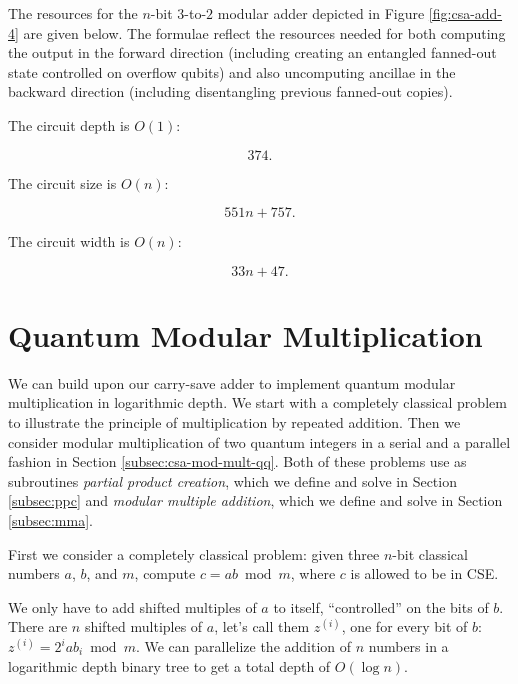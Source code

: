 \documentclass[twoside]{article}
\begin{document}
The resources for the $n$-bit $3$-to-$2$ modular adder depicted in Figure
\ref{fig:csa-add-4} are given below.
The formulae reflect the resources needed for both computing the output
in the forward direction (including creating an entangled fanned-out state
controlled on overflow qubits)
and also uncomputing ancillae in the backward
direction (including disentangling previous fanned-out copies).

The circuit depth is $O(1)$:

\begin{equation}
374\text{.}
\end{equation}

The circuit size is $O(n)$:

\begin{equation}
551n + 757\text{.}
\end{equation}

The circuit width is $O(n)$:

\begin{equation}
33n + 47\text{.}
\end{equation}

%
\section{Quantum Modular Multiplication}
\label{sec:csa-mod-mult}

We can build upon our carry-save adder to implement quantum modular
multiplication in logarithmic depth. We start with a completely classical
problem to illustrate the principle of multiplication by repeated addition.
Then we consider modular multiplication of two quantum integers in a serial
and a parallel fashion in Section
\ref{subsec:csa-mod-mult-qq}. Both of these problems use as subroutines
\emph{partial product creation}, which we define and solve
 in Section \ref{subsec:ppc} and
 \emph{modular multiple addition}, which we define and solve
in Section \ref{subsec:mma}.

First we consider a completely classical problem:
given three $n$-bit classical numbers $a$, $b$, and $m$,
compute $c = ab \bmod m$, where $c$ is allowed to be in CSE.

We only have to add shifted
multiples of $a$ to itself, ``controlled'' on the bits of $b$. There are
$n$ shifted multiples of $a$, let's call them $z^{(i)}$, one for every bit of $b$:
$z^{(i)} = 2^i a b_i \bmod m$.
We can parallelize the addition of $n$ numbers in a logarithmic depth
binary tree to get a total depth of $O(\log n)$.
\end{document}
